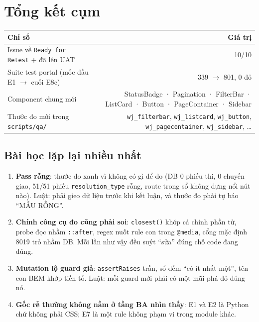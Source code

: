 \section{Tổng kết cụm}

\begin{center}
\small
\begin{tabular}{lr}
\toprule
Chỉ số & Giá trị \\
\midrule
Issue về \texttt{Ready for Retest} + đã lên UAT & 10/10 \\
Suite test portal (mốc đầu E1 $\to$ cuối E8c) & 339 $\to$ 801, 0 đỏ \\
Component chung mới & StatusBadge · Pagination · FilterBar · ListCard · Button · PageContainer · Sidebar \\
Thước đo mới trong \texttt{scripts/qa/} & \texttt{wj\_filterbar}, \texttt{wj\_listcard}, \texttt{wj\_button}, \texttt{wj\_pagecontainer}, \texttt{wj\_sidebar}, … \\
\bottomrule
\end{tabular}
\end{center}

\subsection*{Bài học lặp lại nhiều nhất}
\begin{enumerate}
\item \textbf{Pass rỗng}: thước đo xanh vì không có gì để đo (DB 0 phiếu thi, 0 chuyến giao, 51/51 phiếu
  \texttt{resolution\_type} rỗng, route trong sổ không dựng nổi nút nào). Luật: phải gieo dữ liệu trước khi
  kết luận, và thước đo phải tự báo ``MẪU RỖNG''.
\item \textbf{Chính công cụ đo cũng phải soi}: \texttt{closest()} khớp cả chính phần tử, probe đọc nhầm
  \texttt{::after}, regex nuốt rule con trong \texttt{@media}, cổng mặc định 8019 trỏ nhầm DB. Mỗi lần như vậy
  đều suýt ``sửa'' đúng chỗ code đang đúng.
\item \textbf{Mutation lộ guard giả}: \texttt{assertRaises} trần, sổ đếm ``có ít nhất một'', tên con BEM
  khớp tiền tố. Luật: mỗi guard mới phải có một mũi phá đỏ đúng nó.
\item \textbf{Gốc rễ thường không nằm ở tầng BA nhìn thấy}: E1 và E2 là Python chứ không phải CSS; E7 là
  một rule không phạm vi trong module khác.
\end{enumerate}

